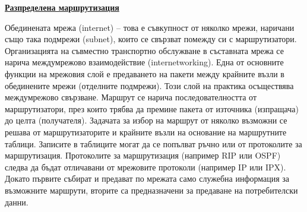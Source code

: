 \documentclass{article}
\begin{document}
\textbf{\underline{Разпределена маршрутизация}}

Обединената мрежа (internet) – това е съвкупност от няколко мрежи, наричани също така подмрежи (subnet), които се свързват
помежду си с маршрутизатори. Организацията на съвместно транспортно обслужване в съставната мрежа се нарича междумрежово
взаимодействие (internetworking). Една от основните функции на мрежовия слой е предаването на пакети между крайните възли в
обединените мрежи (отделните подмрежи). Този слой на практика осъществява междумрежово свързване. Маршрут се нарича
последователността от маршрутизатори, през които трябва да премине пакета от източника (изпращача) до целта (получателя).
Задачата за избор на маршрут от няколко възможни се решава от маршрутизаторите и крайните възли на основание на маршрутните таблици.
Записите в таблиците могат да се попълват ръчно или от протоколите за маршрутизация. Протоколите за маршрутизация (например RIP
или OSPF) следва да бъдат отличавани от мрежовите протоколи (например IP или IPX). Докато първите събират и предават по мрежата
само служебна информация за възможните маршрути, вторите са предназначени за предаване на потребителски данни.
\end{document}
